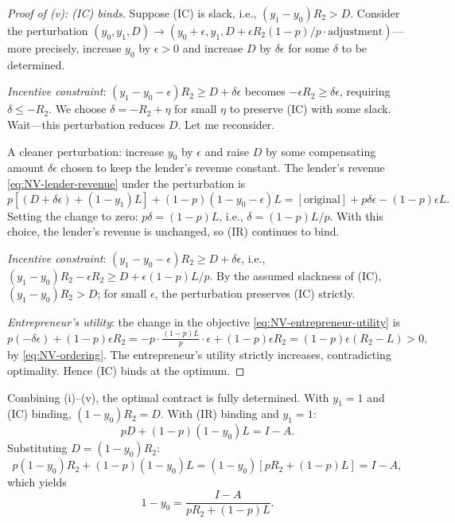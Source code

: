 \documentclass[11pt,a4paper,oneside]{book}
\def\leq{\leqslant}
\def\geq{\geqslant}
\theoremstyle{plain}
\theoremstyle{definition}
\theoremstyle{remark}
\numberwithin{equation}{chapter}
\begin{document}
\begin{proof}[Proof of (v): (IC) binds]
Suppose (IC) is slack, i.e., $(y_1 - y_0) R_2 > D$.
Consider the perturbation $(y_0, y_1, D) \to (y_0 + \epsilon, y_1, D + \epsilon R_2 (1-p)/p \cdot \text{adjustment})$---more precisely, increase $y_0$ by $\epsilon > 0$ and increase $D$ by $\delta \epsilon$ for some $\delta$ to be determined.

\emph{Incentive constraint}: $(y_1 - y_0 - \epsilon) R_2 \geq D + \delta \epsilon$ becomes $-\epsilon R_2 \geq \delta \epsilon$, requiring $\delta \leq -R_2$.
We choose $\delta = -R_2 + \eta$ for small $\eta$ to preserve (IC) with some slack.
Wait---this perturbation reduces $D$.
Let me reconsider.

A cleaner perturbation: increase $y_0$ by $\epsilon$ and raise $D$ by some compensating amount $\delta \epsilon$ chosen to keep the lender's revenue constant.
The lender's revenue \eqref{eq:NV-lender-revenue} under the perturbation is
\begin{equation*}
  p[(D + \delta \epsilon) + (1 - y_1) L] + (1 - p)(1 - y_0 - \epsilon) L
  = [\text{original}] + p \delta \epsilon - (1 - p) \epsilon L.
\end{equation*}
Setting the change to zero: $p \delta = (1 - p) L$, i.e., $\delta = (1 - p) L / p$.
With this choice, the lender's revenue is unchanged, so (IR) continues to bind.

\emph{Incentive constraint}: $(y_1 - y_0 - \epsilon) R_2 \geq D + \delta \epsilon$, i.e., $(y_1 - y_0) R_2 - \epsilon R_2 \geq D + \epsilon (1-p) L / p$.
By the assumed slackness of (IC), $(y_1 - y_0) R_2 > D$; for small $\epsilon$, the perturbation preserves (IC) strictly.

\emph{Entrepreneur's utility}: the change in the objective \eqref{eq:NV-entrepreneur-utility} is
\begin{equation*}
  p (-\delta \epsilon) + (1 - p) \epsilon R_2 = -p \cdot \tfrac{(1-p) L}{p} \cdot \epsilon + (1 - p) \epsilon R_2 = (1 - p) \epsilon (R_2 - L) > 0,
\end{equation*}
by \eqref{eq:NV-ordering}.
The entrepreneur's utility strictly increases, contradicting optimality.
Hence (IC) binds at the optimum.
\end{proof}

Combining (i)--(v), the optimal contract is fully determined.
With $y_1 = 1$ and (IC) binding, $(1 - y_0) R_2 = D$.
With (IR) binding and $y_1 = 1$:
\begin{equation*}
  p D + (1 - p)(1 - y_0) L = I - A.
\end{equation*}
Substituting $D = (1 - y_0) R_2$:
\begin{equation*}
  p (1 - y_0) R_2 + (1 - p)(1 - y_0) L = (1 - y_0) [p R_2 + (1 - p) L] = I - A,
\end{equation*}
which yields
\begin{equation}\label{eq:NV-termination-prob}
  1 - y_0 = \frac{I - A}{p R_2 + (1 - p) L}.
\end{equation}
\end{document}
